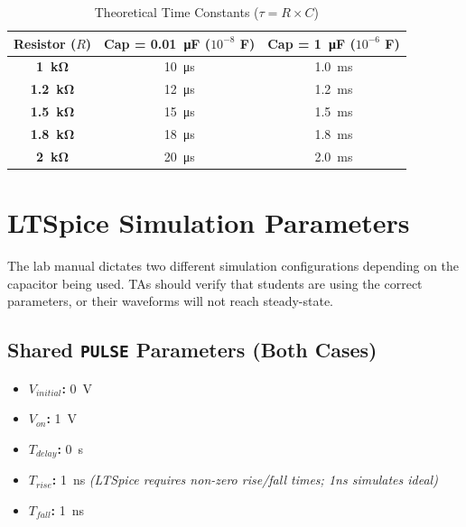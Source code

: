 \documentclass[11pt]{article}
\begin{document}
\begin{table}[H]
  \centering
  \caption{Theoretical Time Constants ($\tau = R \times C$)}
  \begin{tabular}{ccc}
    \toprule
    \textbf{Resistor ($R$)} & \textbf{Cap = \SI{0.01}{\micro\farad} ($10^{-8}$ F)} & \textbf{Cap = \SI{1}{\micro\farad} ($10^{-6}$ F)} \\
    \midrule
    \textbf{\SI{1}{\kilo\ohm}}   & \SI{10}{\micro\second} & \SI{1.0}{\milli\second} \\
    \textbf{\SI{1.2}{\kilo\ohm}} & \SI{12}{\micro\second} & \SI{1.2}{\milli\second} \\
    \textbf{\SI{1.5}{\kilo\ohm}} & \SI{15}{\micro\second} & \SI{1.5}{\milli\second} \\
    \textbf{\SI{1.8}{\kilo\ohm}} & \SI{18}{\micro\second} & \SI{1.8}{\milli\second} \\
    \textbf{\SI{2}{\kilo\ohm}}   & \SI{20}{\micro\second} & \SI{2.0}{\milli\second} \\
    \bottomrule
  \end{tabular}
\end{table}

\vspace{0.2in}
\section*{LTSpice Simulation Parameters}

The lab manual dictates two different simulation configurations depending on the capacitor being used. TAs should verify that students are using the correct parameters, or their waveforms will not reach steady-state.

\subsection*{Shared \texttt{PULSE} Parameters (Both Cases)}
\begin{itemize}
  \item \textbf{$V_{initial}$:} \SI{0}{\volt}
  \item \textbf{$V_{on}$:} \SI{1}{\volt}
  \item \textbf{$T_{delay}$:} \SI{0}{\second}
  \item \textbf{$T_{rise}$:} \SI{1}{\nano\second} \textit{(LTSpice requires non-zero rise/fall times; 1ns simulates ideal)}
  \item \textbf{$T_{fall}$:} \SI{1}{\nano\second}
\end{itemize}
\end{document}
